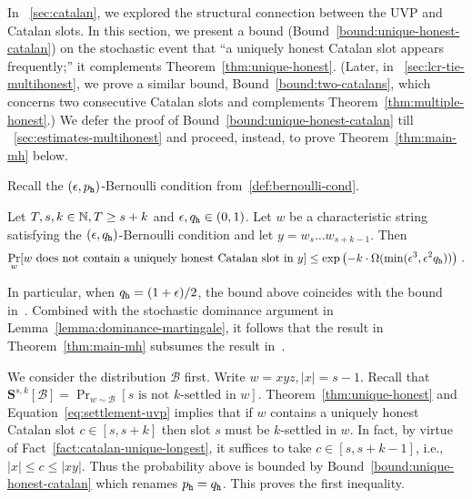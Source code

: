 
In \Section~\ref{sec:catalan}, 
we explored the structural connection 
between the UVP and Catalan slots. 
In this section, we present a bound (Bound~\ref{bound:unique-honest-catalan}) 
on the stochastic event that ``a uniquely honest Catalan slot appears frequently;'' 
it complements Theorem~\ref{thm:unique-honest}. 
(Later, in \Section~\ref{sec:lcr-tie-multihonest}, 
we prove a similar bound, Bound~\ref{bound:two-catalans}, 
which concerns two consecutive Catalan slots and complements Theorem~\ref{thm:multiple-honest}.)
We defer the proof of Bound~\ref{bound:unique-honest-catalan} till \Section~\ref{sec:estimates-multihonest}
and proceed, instead, to prove Theorem~\ref{thm:main-mh} below.



Recall the $(\epsilon, p_{\mathtt{h}})$-Bernoulli condition from~\ref{def:bernoulli-cond}.
\begin{bound}\label{bound:unique-honest-catalan}
  Let $T, s, k \in \mathbb{N}, T \geq s + k$ and  $\epsilon, q_{\mathtt{h}} \in (0, 1)$. 
  Let $w$ be a characteristic string satisfying 
  the $(\epsilon, q_{\mathtt{h}})$-Bernoulli condition 
  and let $y = w_s \ldots w_{s+k-1}$.
  Then 
  \[
    \Pr_w[\text{$w$ does not contain a uniquely honest Catalan slot in $y$}]  
      \leq 
      \exp\left(
        -k\cdot \Omega(\min(\epsilon^3, \epsilon^2 q_{\mathtt{h}})) 
      \right)
      \,.
  \]
\end{bound}
In particular, 
when $q_{\mathtt{h}} = (1+\epsilon)/2$, 
the bound above coincides with the 
bound in~\citet{LinearConsistency}. 
Combined with the stochastic dominance argument in Lemma~\ref{lemma:dominance-martingale}, 
it follows that the result in Theorem~\ref{thm:main-mh} subsumes the result in~\citet{LinearConsistency}.








  We consider the distribution $\mathcal{B}$ first. 
  Write $w = xyz, |x| = s - 1$.
  Recall that  
  $
    \mathbf{S}^{s,k}[\mathcal{B}] 
    = \Pr_{w \sim \mathcal{B}}[\text{$s$ is not $k$-settled in $w$}]
  $. 
  Theorem~\ref{thm:unique-honest} and Equation~\eqref{eq:settlement-uvp} implies that 
  if $w$ contains a uniquely honest Catalan slot $c \in [s, s + k]$ 
  then slot $s$ must be $k$-settled in $w$. 
  In fact, by virtue of Fact~\ref{fact:catalan-unique-longest}, 
  it suffices to take $c \in [s, s + k - 1]$, 
  i.e., $|x| \leq c \leq |xy|$. 
  Thus the probability above is bounded by 
  Bound~\ref{bound:unique-honest-catalan} 
  which renames $p_{\mathtt{h}} = q_{\mathtt{h}}$.
  This proves the first inequality. 
  
